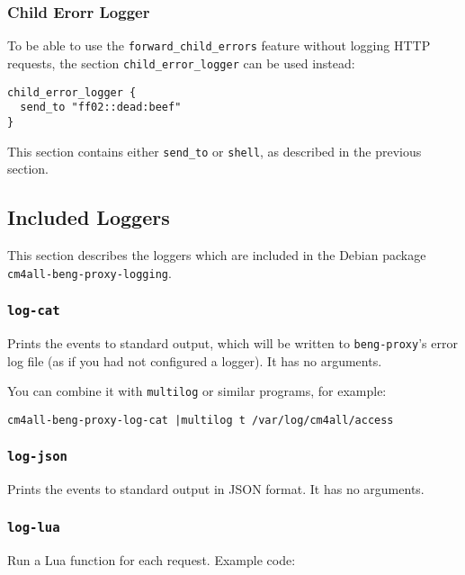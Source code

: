 \documentclass[a4paper,12pt]{article}
\begin{document}
\subsubsection{Child Erorr Logger}

To be able to use the \verb|forward_child_errors| feature without
logging HTTP requests, the section \verb|child_error_logger| can be
used instead:

\begin{verbatim}
child_error_logger {
  send_to "ff02::dead:beef"
}
\end{verbatim}

This section contains either \verb|send_to| or \verb|shell|, as
described in the previous section.


\subsection{Included Loggers}

This section describes the loggers which are included in the Debian
package \texttt{cm4all-beng-proxy-logging}.

\subsubsection{\texttt{log-cat}}

Prints the events to standard output, which will be written to
\texttt{beng-proxy}'s error log file (as if you had not configured a
logger).  It has no arguments.

You can combine it with \texttt{multilog} or similar programs, for
example:

\begin{verbatim}
cm4all-beng-proxy-log-cat |multilog t /var/log/cm4all/access
\end{verbatim}

\subsubsection{\texttt{log-json}}

Prints the events to standard output in JSON format.  It has no
arguments.

\subsubsection{\texttt{log-lua}}

Run a Lua function for each request.  Example code:
\end{document}
